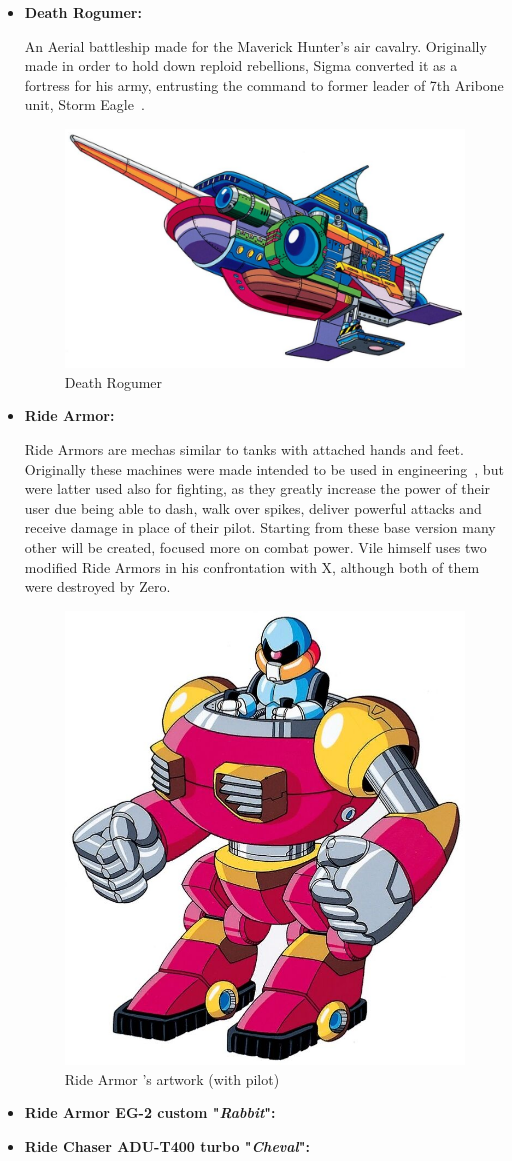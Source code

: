 \begin{itemize}
	\item \hypertarget{veichle:Death_Rogumer}{\textbf{Death Rogumer:}}
	An Aerial battleship made for the Maverick Hunter's air cavalry. Originally made in order to hold down reploid rebellions, Sigma converted it as a fortress 
	for his army, entrusting the command to former leader of 7th Aribone unit, Storm Eagle~\cite{wayback:X_resources}.
	\begin{figure}[htp]
		\centering
		\includegraphics[width=\linewidth]{figures/X1/Storm_eagle/DeathRogumer.jpg}
		\caption{Death Rogumer}
	\end{figure}
	\item \hypertarget{veichle:Ride_Armor}{\textbf{Ride Armor:}}
	Ride Armors are mechas similar to tanks with attached hands and feet. Originally these machines were made intended to be used in engineering~\cite{wayback:X_resources}, but were latter used also for fighting, as they greatly increase the power of their user due being able to dash, walk over spikes, deliver powerful attacks and receive damage in place of 
	their pilot. Starting from these base version many other will be created, focused more on combat power. Vile himself uses two modified Ride Armors in his confrontation with X, although both of them were destroyed by Zero.
	\begin{figure}[htp]
		\centering
		\includegraphics[width=0.5\linewidth]{figures/X1/Enemies/ArmorSoldier.jpg}
		\caption{Ride Armor 's artwork (with pilot)}
	\end{figure}
	
	\item \hypertarget{veichle:Ride_Armor_Rabbit}{\textbf{Ride Armor EG-2 custom "\textit{Rabbit}":}}


	\item \hypertarget{veichle:Ride_Chaser_Cheval}{\textbf{Ride Chaser ADU-T400 turbo "\textit{Cheval}": }}	
\end{itemize}